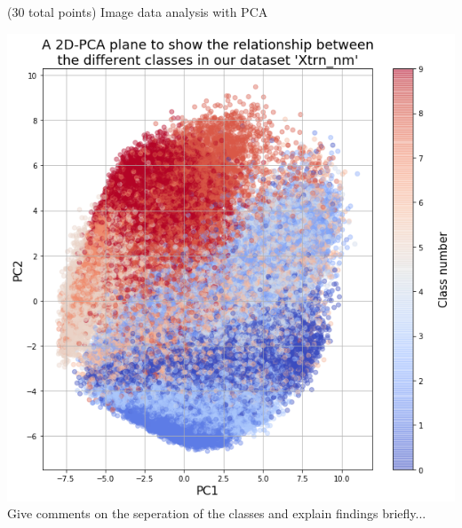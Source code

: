 \documentclass[12pt]{article}
\begin{document}
\begin{question}{(30 total points) Image data analysis with PCA}
\begin{subquestion}
   

      \begin{answerbox}{50em}
        \includegraphics[width=1\textwidth]{images/q18.png}
        Give comments on the seperation of the classes and explain findings briefly...
      \end{answerbox}
  


   \end{subquestion}
   

\end{question}
\clearpage
%
%
\end{document}
